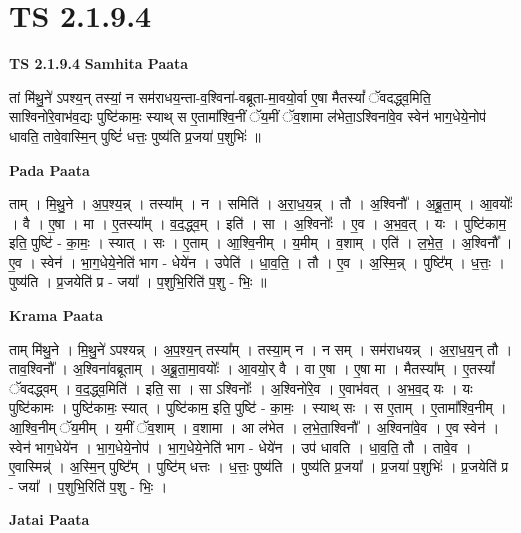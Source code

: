 \documentclass[17pt]{extarticle}
\begin{document}
\section*{ TS 2.1.9.4 }

\textbf{TS 2.1.9.4 } \newline
\textbf{Samhita Paata} \newline

तां मि॑थु॒ने॑ ऽपश्य॒न् तस्यां॒ न सम॑राधय॒न्ता-व॒श्विना॑-वब्रूता-मा॒वयो॒र्वा ए॒षा मैतस्यां᳚ ॅवदद्ध्व॒मिति॒ साश्विनो॑रे॒वाभ॑व॒द्यः पुष्टि॑कामः॒ स्याथ् स ए॒तामा᳚श्वि॒नीं ॅय॒मीं ॅव॒शामा ल॑भेता॒ऽश्विना॑वे॒व स्वेन॑ भाग॒धेये॒नोप॑ धावति॒ तावे॒वास्मि॒न् पुष्टिं॑ धत्तः॒ पुष्य॑ति प्र॒जया॑ प॒शुभिः॑ ॥ \newline

\textbf{Pada Paata} \newline

ताम् । मि॒थु॒ने । अ॒प॒श्य॒न्न् । तस्या᳚म् । न । समिति॑ । अ॒रा॒ध॒य॒न्न् । तौ । अ॒श्विनौ᳚ । अ॒ब्रू॒ता॒म् । आ॒वयोः᳚ । वै । ए॒षा । मा । ए॒तस्या᳚म् । व॒द॒द्ध्व॒म् । इति॑ । सा । अ॒श्विनोः᳚ । ए॒व । अ॒भ॒व॒त् । यः । पुष्टि॑काम॒ इति॒ पुष्टि॑ - का॒मः॒ । स्यात् । सः । ए॒ताम् । आ॒श्वि॒नीम् । य॒मीम् । व॒शाम् । एति॑ । ल॒भे॒त॒ । अ॒श्विनौ᳚ । ए॒व । स्वेन॑ । भा॒ग॒धेये॒नेति॑ भाग - धेये॑न । उपेति॑ । धा॒व॒ति॒ । तौ । ए॒व । अ॒स्मि॒न्न् । पुष्टि᳚म् । ध॒त्तः॒ । पुष्य॑ति । प्र॒जयेति॑ प्र - जया᳚ । प॒शुभि॒रिति॑ प॒शु - भिः॒ ॥  \newline


\textbf{Krama Paata} \newline

ताम् मि॑थु॒ने । मि॒थु॒ने॑ ऽपश्यन्न् । अ॒प॒श्य॒न् तस्या᳚म् । तस्या॒म् न । न सम् । सम॑राधयन्न् । अ॒रा॒ध॒य॒न् तौ । ताव॒श्विनौ᳚ । अ॒श्विना॑वब्रूताम् । अ॒ब्रू॒ता॒मा॒वयोः᳚ । आ॒वयो॒र् वै । वा ए॒षा । ए॒षा मा । मैतस्या᳚म् । ए॒तस्यां᳚ ॅवदद्ध्वम् । व॒द॒द्ध्व॒मिति॑ । इति॒ सा । सा ऽश्विनोः᳚ । अ॒श्विनो॑रे॒व । ए॒वाभ॑वत् । अ॒भ॒व॒द् यः । यः पुष्टि॑कामः । पुष्टि॑कामः॒ स्यात् । पुष्टि॑काम॒ इति॒ पुष्टि॑ - का॒मः॒ । स्याथ् सः । स ए॒ताम् । ए॒तामा᳚श्वि॒नीम् । आ॒श्वि॒नीम् ॅय॒मीम् । य॒मीं ॅव॒शाम् । व॒शामा । आ ल॑भेत । ल॒भे॒ता॒श्विनौ᳚ । अ॒श्विना॑वे॒व । ए॒व स्वेन॑ । स्वेन॑ भाग॒धेये॑न । भा॒ग॒धेये॒नोप॑ । भा॒ग॒धेये॒नेति॑ भाग - धेये॑न । उप॑ धावति । धा॒व॒ति॒ तौ । तावे॒व । ए॒वास्मिन्न्॑ । अ॒स्मि॒न् पुष्टि᳚म् । पुष्टि॑म् धत्तः । ध॒त्तः॒ पुष्य॑ति । पुष्य॑ति प्र॒जया᳚ । प्र॒जया॑ प॒शुभिः॑ । प्र॒जयेति॑ प्र - जया᳚ । प॒शुभि॒रिति॑ प॒शु - भिः॒ । \newline

\textbf{Jatai Paata} \newline
\end{document}
